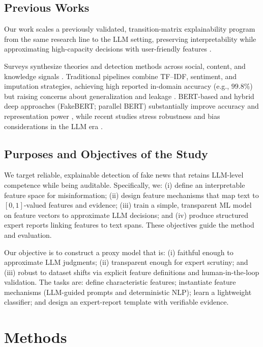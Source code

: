 \documentclass[ai,article,submit,pdftex,moreauthors]{Definitions/mdpi}
\begin{document}
\subsection{Previous Works}
Our work scales a previously validated, transition-matrix explainability program from the same research line to the LLM setting, preserving interpretability while approximating high-capacity decisions with user-friendly features \cite{radiuk2024matrices,barmak2024healthcare}.

Surveys synthesize theories and detection methods across social, content, and knowledge signals \cite{zhou2020survey,tandoc2019facts,pennycook2021psychology}. Traditional pipelines combine TF--IDF, sentiment, and imputation strategies, achieving high reported in-domain accuracy (e.g., $99.8\%$) but raising concerns about generalization and leakage \cite{amer2021context,ahmed2022development,villela2023review}. BERT-based and hybrid deep approaches (FakeBERT; parallel BERT) substantially improve accuracy and representation power \cite{kaliyar2021fakebert,farokhian2022parallel}, while recent studies stress robustness and bias considerations in the LLM era \cite{wu2023sheep,park2024adstyle,su2023biased,leite2023weak}.

\subsection{Purposes and Objectives of the Study}
We target reliable, explainable detection of fake news that retains LLM-level competence while being auditable. Specifically, we: (i) define an interpretable feature space for misinformation; (ii) design feature mechanisms that map text to $[0,1]$-valued features and evidence; (iii) train a simple, transparent ML model on feature vectors to approximate LLM decisions; and (iv) produce structured expert reports linking features to text spans. These objectives guide the method and evaluation.

Our objective is to construct a proxy model that is: (i) faithful enough to approximate LLM judgments; (ii) transparent enough for expert scrutiny; and (iii) robust to dataset shifts via explicit feature definitions and human-in-the-loop validation. The tasks are: define characteristic features; instantiate feature mechanisms (LLM-guided prompts and deterministic NLP); learn a lightweight classifier; and design an expert-report template with verifiable evidence.

\section{Methods}\label{sec:methods}
\end{document}
